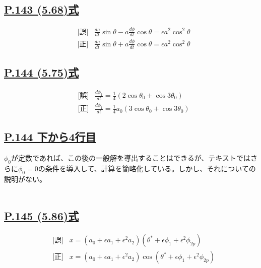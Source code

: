 \documentclass[9pt,fleqn]{bxjsarticle}
\begin{document}
\subsection*{\underline{P.143 (5.68)式}}
\begin{align*}
    &\text{[誤]} \hspace{10pt} \frac{da}{dt}\sin{\theta} - a\frac{d\phi}{dt}\cos{\theta} = {\epsilon}a^2\cos^2{\theta} \\
    &\text{[正]} \hspace{10pt} \frac{da}{dt}\sin{\theta} + a\frac{d\phi}{dt}\cos{\theta} = {\epsilon}a^2\cos^2{\theta} 
\end{align*}

\subsection*{\underline{P.144 (5.75)式}}
\begin{align*}
    &\text{[誤]} \hspace{10pt} \frac{d\phi_1}{dt} = \frac{1}{4}\left(2\cos{\theta_0}+\cos{3\theta_0}\right) \\
    &\text{[正]} \hspace{10pt} \frac{d\phi_1}{dt} = \frac{1}{4}a_0\left(3\cos{\theta_0}+\cos{3\theta_0}\right) 
\end{align*}

\subsection*{\underline{P.144 下から4行目}}
$\phi_0$が定数であれば、この後の一般解を導出することはできるが、テキストではさらに$\phi_0=0$の条件を導入して、計算を簡略化している。しかし、それについての説明がない。\\\\

\subsection*{\underline{P.145 (5.86)式}}
\begin{align*}
    &\text{[誤]} \hspace{10pt} x = \left(a_0+{\epsilon}a_1+\epsilon^2a_2\right)\left(\theta^*+\epsilon\phi_1+\epsilon^2\phi_{2p}\right) \\
    &\text{[正]} \hspace{10pt} x = \left(a_0+{\epsilon}a_1+\epsilon^2a_2\right)\cos{\left(\theta^*+\epsilon\phi_1+\epsilon^2\phi_{2p}\right)}
\end{align*}
\end{document}
